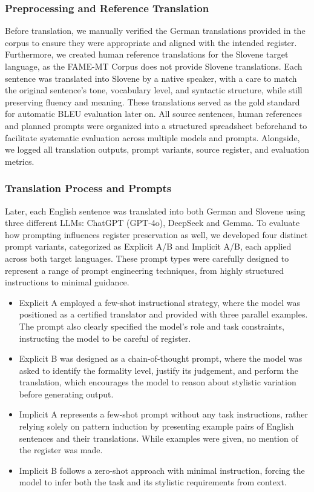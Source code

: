 \documentclass[fleqn,moreauthors,10pt]{ds_report}
\begin{document}
	\subsubsection*{Preprocessing and Reference Translation}
	
Before translation, we manually verified the German translations provided in the corpus to ensure they were appropriate and aligned with the intended register. Furthermore, we created human reference translations for the Slovene target language, as the FAME-MT Corpus does not provide Slovene translations. Each sentence was translated into Slovene by a native speaker, with a care to match the original sentence’s tone, vocabulary level, and syntactic structure, while still preserving fluency and meaning. These translations served as the gold standard for automatic BLEU evaluation later on.
All source sentences, human references and planned prompts were organized into a structured spreadsheet beforehand to facilitate systematic evaluation across multiple models and prompts. Alongside, we logged all translation outputs, prompt variants, source register, and evaluation metrics.

\subsubsection*{Translation Process and Prompts}

Later, each English sentence was translated into both German and Slovene using three different LLMs: ChatGPT (GPT-4o), DeepSeek and Gemma. To evaluate how prompting influences register preservation as well, we developed four distinct prompt variants, categorized as Explicit A/B and Implicit A/B, each applied across both target languages. These prompt types were carefully designed to represent a range of prompt engineering techniques, from highly structured instructions to minimal guidance. 
		
\begin{itemize}
	\item Explicit A employed a few-shot instructional strategy, where the model was positioned as a certified translator and provided with three parallel examples. The prompt also clearly specified the model’s role and task constraints, instructing the model to be careful of register.
	\item Explicit B was designed as a chain-of-thought prompt, where the model was asked to identify the formality level, justify its judgement, and perform the translation, which encourages the model to reason about stylistic variation before generating output.
	\item Implicit A represents a few-shot prompt without any task instructions, rather relying solely on pattern induction by presenting example pairs of English sentences and their translations. While examples were given, no mention of the register was made.
	\item Implicit B follows a zero-shot approach with minimal instruction, forcing the model to infer both the task and its stylistic requirements from context.
\end{itemize}
	
\end{document}
